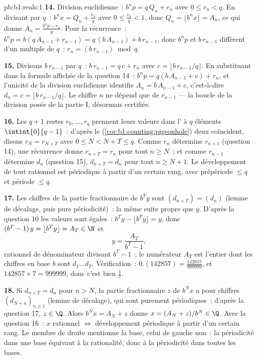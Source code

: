 \begin{solution}{pb:b1:reals:1}
\textbf{14.} Division euclidienne~: $b^n p = q\,Q_n + r_n$ avec $0
\leq r_n < q$. En divisant par $q$~: $b^n x = Q_n + \frac{r_n}{q}$
avec $0 \leq \frac{r_n}{q} < 1$, donc $Q_n = \lfloor b^n x \rfloor
= A_n$, ce qui donne $A_n = \frac{b^n p - r_n}{q}$. Pour la
récurrence~: $b^n p = b(q\,A_{n-1} + r_{n-1}) = q\,(b\,A_{n-1}) +
b\,r_{n-1}$, donc $b^n p$ et $b\,r_{n-1}$ diffèrent d'un multiple
de $q$~: $r_n = (b\,r_{n-1}) \bmod q$.

\textbf{15.} Divisons $b\,r_{n-1}$ par $q$~: $b\,r_{n-1} = q\,c +
r_n$ avec $c = \lfloor b\,r_{n-1}/q \rfloor$. En substituant dans
la formule affichée de la question 14~: $b^n p = q(b\,A_{n-1} + c)
+ r_n$, et l'unicité de la division euclidienne identifie $A_n =
b\,A_{n-1} + c$, c'est-à-dire $d_n = c = \lfloor b\,r_{n-1}/q
\rfloor$. Le chiffre $n$ ne dépend que de $r_{n-1}$ --- la boucle
de la division posée de la partie I, désormais certifiée.

\textbf{16.} Les $q + 1$ restes $r_0, \dots, r_q$ prennent leurs
valeurs dans l' à $q$ éléments $\intint{0}{q-1}$~: d'après
le  (\cref{cor:b1:counting:pigeonhole}) deux
coïncident, disons $r_N = r_{N+T}$ avec $0 \leq N < N + T \leq q$.
Comme $r_n$ détermine $r_{n+1}$ (question 14), une récurrence donne
$r_{n+T} = r_n$ pour tout $n \geq N$~; et comme $r_{n-1}$ détermine
$d_n$ (question 15), $d_{n+T} = d_n$ pour tout $n \geq N + 1$. Le
développement de tout rationnel est périodique à partir d'un certain
rang, avec prépériode $\leq q$ et période $\leq q$.

\textbf{17.} Les chiffres de la partie fractionnaire de $b^T y$ sont
$(d_{n+T}) = (d_n)$ (lemme de décalage, puis pure périodicité)~: la
même suite propre que $y$. D'après la question 10 les valeurs sont
égales~: $b^T y - \lfloor b^T y \rfloor = y$, donc $(b^T - 1)\,y =
\lfloor b^T y \rfloor = A_T \in \N$ et
\[
y = \frac{A_T}{b^T - 1} ,
\]
rationnel de dénominateur divisant $b^T - 1$~; le numérateur $A_T$
est l'entier dont les chiffres en base $b$ sont $d_1 \dots d_T$.
Vérification~: $0.(142857) = \frac{142857}{999999}$, et $142857
\times 7 = 999999$, donc c'est bien $\frac 17$.

\textbf{18.} Si $d_{n+T} = d_n$ pour $n > N$, la partie
fractionnaire $z$ de $b^N x$ a pour chiffres $(d_{N+n})_{n\geq1}$
(lemme de décalage), qui sont purement périodiques~; d'après la
question 17, $z \in \Q$. Alors $b^N x = A_N + z$ donne $x = (A_N +
z)/b^N \in \Q$. Avec la question 16~: $x$ rationnel $\iff$
développement périodique à partir d'un certain rang. Le membre de
droite mentionne la base, celui de gauche non~: la périodicité dans
une base équivaut à la rationalité, donc à la périodicité dans
toutes les bases.


\end{solution}
